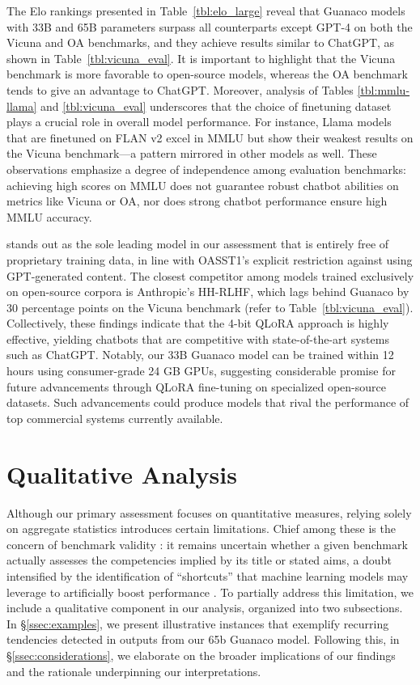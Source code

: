 The Elo rankings presented in Table~\ref{tbl:elo_large} reveal that {Guanaco} models with 33B and 65B parameters surpass all counterparts except GPT-4 on both the Vicuna and OA benchmarks, and they achieve results similar to ChatGPT, as shown in Table~\ref{tbl:vicuna_eval}. It is important to highlight that the Vicuna benchmark is more favorable to open-source models, whereas the OA benchmark tends to give an advantage to ChatGPT. Moreover, analysis of Tables \ref{tbl:mmlu-llama} and \ref{tbl:vicuna_eval} underscores that the choice of finetuning dataset plays a crucial role in overall model performance. For instance, Llama models that are finetuned on FLAN v2 excel in MMLU but show their weakest results on the Vicuna benchmark—a pattern mirrored in other models as well. These observations emphasize a degree of independence among evaluation benchmarks: achieving high scores on MMLU does not guarantee robust chatbot abilities on metrics like Vicuna or OA, nor does strong chatbot performance ensure high MMLU accuracy.

 stands out as the sole leading model in our assessment that is entirely free of proprietary training data, in line with OASST1’s explicit restriction against using GPT-generated content. The closest competitor among models trained exclusively on open-source corpora is Anthropic’s HH-RLHF, which lags behind {Guanaco} by 30 percentage points on the Vicuna benchmark (refer to Table~\ref{tbl:vicuna_eval}). Collectively, these findings indicate that the 4-bit \textsc{QLoRA} approach is highly effective, yielding chatbots that are competitive with state-of-the-art systems such as ChatGPT. Notably, our 33B {Guanaco} model can be trained within 12 hours using consumer-grade 24 GB GPUs, suggesting considerable promise for future advancements through \textsc{QLoRA} fine-tuning on specialized open-source datasets. Such advancements could produce models that rival the performance of top commercial systems currently available.

\section{Qualitative Analysis}

Although our primary assessment focuses on quantitative measures, relying solely on aggregate statistics introduces certain limitations. Chief among these is the concern of benchmark validity \citep{liao2021we}: it remains uncertain whether a given benchmark actually assesses the competencies implied by its title or stated aims, a doubt intensified by the identification of ``shortcuts'' that machine learning models may leverage to artificially boost performance \citep{gururangan2018annotation, poliak2018hypothesis}. To partially address this limitation, we include a qualitative component in our analysis, organized into two subsections. In \S\ref{ssec:examples}, we present illustrative instances that exemplify recurring tendencies detected in outputs from our 65b {Guanaco} model. Following this, in \S\ref{ssec:considerations}, we elaborate on the broader implications of our findings and the rationale underpinning our interpretations.

